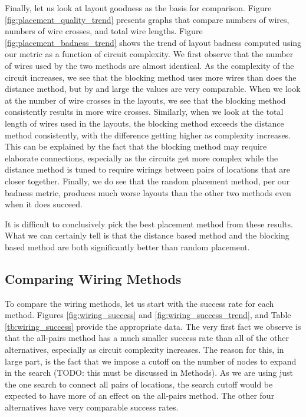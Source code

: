 Finally, let us look at layout goodness as the basis for comparison. Figure
\ref{fig:placement_quality_trend} presents graphs that compare numbers of wires,
numbers of wire crosses, and total wire lengths.
Figure \ref{fig:placement_badness_trend} shows the trend of layout badness
computed using our metric as a function of circuit complexity.
We first observe that the
number of wires used by the two methods are almost identical. As the complexity
of the circuit increases, we see that the blocking method uses more wires than
does the distance method, but by and large the values are very comparable. When
we look at the number of wire crosses in the layouts, we
see that the blocking method consistently results in more wire crosses. Similarly,
when we look at the total length of wires used in the layouts, the blocking
method exceeds the distance method consistently, with the difference getting
higher as complexity increases. This can be explained by the fact that the
blocking method may require elaborate connections, especially as the circuits
get more complex while the distance method is tuned to require wirings between
pairs of locations that are closer together. Finally, we do see that the random
placement method, per our badness metric, produces much worse layouts than the
other two methods even when it does succeed.

It is difficult to conclusively pick the best placement method from these
results. What we can certainly tell is that the distance based method and the
blocking based method are both significantly better than random placement.

\subsection{Comparing Wiring Methods}

To compare the wiring methods, let us start with the success rate for each method.
Figures \ref{fig:wiring_success} and \ref{fig:wiring_success_trend}, and Table
\ref{tb:wiring_success} provide the appropriate data. The very first fact we
observe is that the all-pairs method has a much smaller success rate than all of
the other alternatives, especially as circuit complexity increases. The reason
for this, in large part, is the fact that we impose a cutoff on the number of
nodes to expand in the search (TODO: this must be discussed in Methods). As we
are using just the one search to connect all pairs of locations, the search
cutoff would be expected to have more of an effect on the all-pairs method. The
other four alternatives have very comparable success rates.

